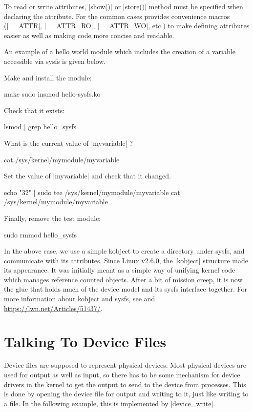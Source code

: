 \documentclass[10pt, oneside]{book}
\begin{document}
To read or write attributes, \cpp|show()| or \cpp|store()| method must be specified when declaring the attribute.
For the common cases  provides convenience macros (\cpp|__ATTR|, \cpp|__ATTR_RO|, \cpp|__ATTR_WO|, etc.) to make defining attributes easier as well as making code more concise and readable.

An example of a hello world module which includes the creation of a variable accessible via sysfs is given below.


Make and install the module:

\begin{codebash}
make
sudo insmod hello-sysfs.ko
\end{codebash}

Check that it exists:

\begin{codebash}
lsmod | grep hello_sysfs
\end{codebash}

What is the current value of \cpp|myvariable| ?

\begin{codebash}
cat /sys/kernel/mymodule/myvariable
\end{codebash}

Set the value of \cpp|myvariable| and check that it changed.

\begin{codebash}
echo "32" | sudo tee /sys/kernel/mymodule/myvariable
cat /sys/kernel/mymodule/myvariable
\end{codebash}

Finally, remove the test module:

\begin{codebash}
sudo rmmod hello_sysfs
\end{codebash}

In the above case, we use a simple kobject to create a directory under sysfs, and communicate with its attributes.
Since Linux v2.6.0, the \cpp|kobject| structure made its appearance.
It was initially meant as a simple way of unifying kernel code which manages reference counted objects.
After a bit of mission creep, it is now the glue that holds much of the device model and its sysfs interface together.
For more information about kobject and sysfs, see  and \url{https://lwn.net/Articles/51437/}.

\section{Talking To Device Files}
\label{sec:device_files}
Device files are supposed to represent physical devices.
Most physical devices are used for output as well as input, so there has to be some mechanism for device drivers in the kernel to get the output to send to the device from processes.
This is done by opening the device file for output and writing to it, just like writing to a file.
In the following example, this is implemented by \cpp|device_write|.
\end{document}
